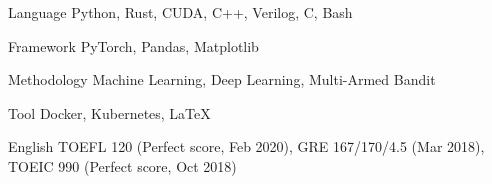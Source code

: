 

\begin{cvskills}

  \cvskill
    {Language} %
    {Python, Rust, CUDA, C++, Verilog, C, Bash} %

  \cvskill
    {Framework} %
    {PyTorch, Pandas, Matplotlib} %

  \cvskill
    {Methodology} %
    {Machine Learning, Deep Learning, Multi-Armed Bandit} %

  \cvskill
    {Tool} %
    {Docker, Kubernetes, LaTeX} %

  \cvskill
    {English} %
    {TOEFL 120 (Perfect score, Feb 2020), GRE 167/170/4.5 (Mar 2018), TOEIC 990 (Perfect score, Oct 2018)} %

\end{cvskills}

